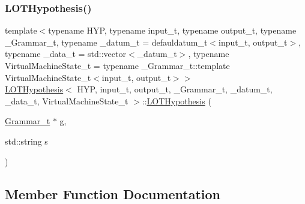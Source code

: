 \subsubsection{\texorpdfstring{L\+O\+T\+Hypothesis()}{LOTHypothesis()}\hspace{0.1cm}{\footnotesize\ttfamily [4/4]}}
{\footnotesize\ttfamily template$<$typename H\+YP, typename input\+\_\+t, typename output\+\_\+t, typename \+\_\+\+Grammar\+\_\+t, typename \+\_\+datum\+\_\+t = defauldatum\+\_\+t$<$input\+\_\+t, output\+\_\+t$>$, typename \+\_\+data\+\_\+t = std\+::vector$<$\+\_\+datum\+\_\+t$>$, typename Virtual\+Machine\+State\+\_\+t = typename \+\_\+\+Grammar\+\_\+t\+::template Virtual\+Machine\+State\+\_\+t$<$input\+\_\+t, output\+\_\+t$>$$>$ \\
\hyperlink{class_l_o_t_hypothesis}{L\+O\+T\+Hypothesis}$<$ H\+YP, input\+\_\+t, output\+\_\+t, \+\_\+\+Grammar\+\_\+t, \+\_\+datum\+\_\+t, \+\_\+data\+\_\+t, Virtual\+Machine\+State\+\_\+t $>$\+::\hyperlink{class_l_o_t_hypothesis}{L\+O\+T\+Hypothesis} (\begin{DoxyParamCaption}\item[{\hyperlink{class_l_o_t_hypothesis_a8006204013d471860e54c49d19edbace}{Grammar\+\_\+t} $\ast$}]{g,  }\item[{std\+::string}]{s }\end{DoxyParamCaption})\hspace{0.3cm}{\ttfamily [inline]}}



\subsection{Member Function Documentation}
\mbox{\label{class_l_o_t_hypothesis_a9f528a8b204b87cc6fcf8d81c8c2b036}} 
